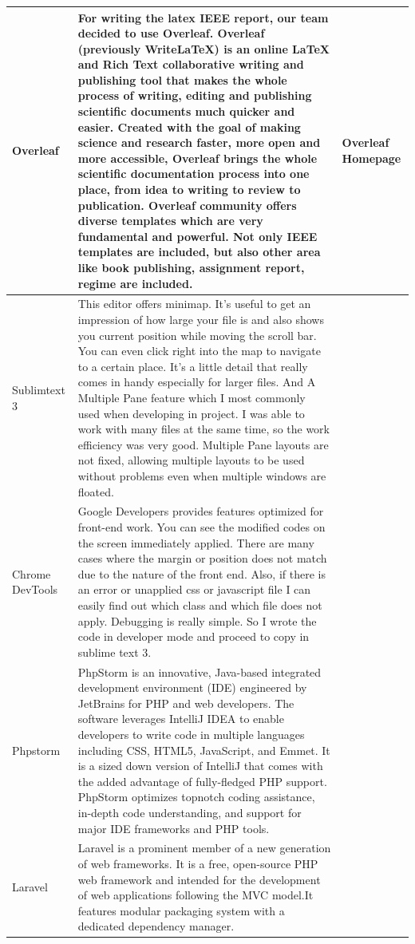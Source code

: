 \documentclass[letterpaper, 10 pt, conference]{ieeeconf}  %
\begin{document}
\begin{supertabular}{ |p{1cm}|p{5cm}|p{1cm}|  }
 \hline
 Overleaf & For writing the latex IEEE report, our team decided to use Overleaf.  Overleaf (previously WriteLaTeX) is an online LaTeX and Rich Text collaborative writing and publishing tool that makes the whole process of writing, editing and publishing scientific documents much quicker and easier.
Created with the goal of making science and research faster, more open and more accessible, Overleaf brings the whole scientific documentation process into one place, from idea to writing to review to publication.
Overleaf community offers diverse templates which are very fundamental and powerful. Not only IEEE templates are included, but also other area like book publishing, assignment report, regime are included. & Overleaf Homepage \\
\hline
Sublimtext 3 & This editor offers minimap. It’s useful to get an impression of how large your file is and also shows you current position while moving the scroll bar. You can even click right into the map to navigate to a certain place. It’s a little detail that really comes in handy especially for larger files.  And A Multiple Pane feature which I most commonly used when developing in project. I was able to work with many files at the same time, so the work efficiency was very good. Multiple Pane layouts are not fixed, allowing multiple layouts to be used without problems even when multiple windows are floated. &  \\
\hline
Chrome DevTools &Google Developers provides features optimized for front-end work. You can see the modified codes on the screen immediately applied. There are many cases where the margin or position does not match due to the nature of the front end. Also, if there is an error or unapplied css or javascript file I can easily find out which class and which file does not apply. Debugging is really simple. So I wrote the code in developer mode and proceed to copy in sublime text 3. &   \\
\hline
Phpstorm & PhpStorm is an innovative, Java-based integrated development environment (IDE) engineered by JetBrains for PHP and web developers. The software leverages IntelliJ IDEA to enable developers to write code in multiple languages including CSS, HTML5, JavaScript, and Emmet. It is a sized down version of IntelliJ that comes with the added advantage of fully-fledged PHP support. PhpStorm optimizes topnotch coding assistance, in-depth code understanding, and support for major IDE frameworks and PHP tools. &  \\
\hline
Laravel & Laravel is a prominent member of a new generation of web frameworks. It is a free, open-source PHP web framework and intended for the development of web applications following the MVC model.It features modular packaging system with a dedicated dependency manager.

\end{supertabular}
\end{document}

